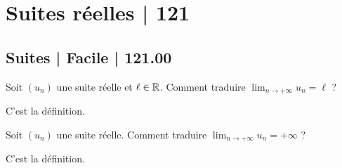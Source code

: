 




\section{Suites réelles | 121}

\subsection{Suites | Facile | 121.00}


\begin{question}
Soit $(u_n)$ une suite réelle et $\ell \in \mathbb{R}$. Comment traduire $\displaystyle \lim _{n\to +\infty}u_n=\ell$ ?
\begin{answers}  
\end{answers}
\begin{explanations}
C'est la définition.
\end{explanations}
\end{question}



\begin{question}
Soit $(u_n)$ une suite réelle. Comment traduire $\displaystyle \lim _{n\to +\infty}u_n=+\infty$ ?
\begin{answers}  
\end{answers}
\begin{explanations}
C'est la définition.
\end{explanations}
\end{question}



